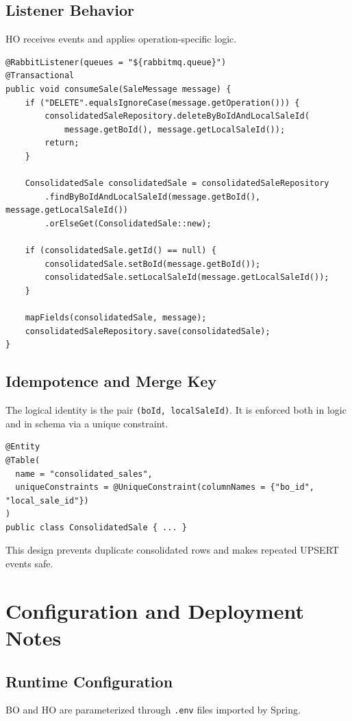 \documentclass[11pt,a4paper]{article}
\begin{document}
\subsection{Listener Behavior}
HO receives events and applies operation-specific logic.

\begin{lstlisting}[style=javastyle,caption={HO listener applies DELETE vs UPSERT semantics}]
@RabbitListener(queues = "${rabbitmq.queue}")
@Transactional
public void consumeSale(SaleMessage message) {
    if ("DELETE".equalsIgnoreCase(message.getOperation())) {
        consolidatedSaleRepository.deleteByBoIdAndLocalSaleId(
            message.getBoId(), message.getLocalSaleId());
        return;
    }

    ConsolidatedSale consolidatedSale = consolidatedSaleRepository
        .findByBoIdAndLocalSaleId(message.getBoId(), message.getLocalSaleId())
        .orElseGet(ConsolidatedSale::new);

    if (consolidatedSale.getId() == null) {
        consolidatedSale.setBoId(message.getBoId());
        consolidatedSale.setLocalSaleId(message.getLocalSaleId());
    }

    mapFields(consolidatedSale, message);
    consolidatedSaleRepository.save(consolidatedSale);
}
\end{lstlisting}

\subsection{Idempotence and Merge Key}
The logical identity is the pair \texttt{(boId, localSaleId)}. It is enforced both in logic and in schema via a unique constraint.

\begin{lstlisting}[style=javastyle,caption={HO consolidated entity unique key}]
@Entity
@Table(
  name = "consolidated_sales",
  uniqueConstraints = @UniqueConstraint(columnNames = {"bo_id", "local_sale_id"})
)
public class ConsolidatedSale { ... }
\end{lstlisting}

This design prevents duplicate consolidated rows and makes repeated UPSERT events safe.

\section{Configuration and Deployment Notes}
\subsection{Runtime Configuration}
BO and HO are parameterized through \texttt{.env} files imported by Spring.
\end{document}

